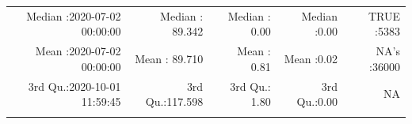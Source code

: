 \documentclass[
  10pt,
  a4paper,oneside]{article}
\begin{document}
\begin{longtable}[]{@{}rrrrr@{}}
\begin{minipage}[t]{0.27\columnwidth}\raggedleft
Median :2020-07-02 00:00:00\strut
\end{minipage} & \begin{minipage}[t]{0.16\columnwidth}\raggedleft
Median : 89.342\strut
\end{minipage} & \begin{minipage}[t]{0.14\columnwidth}\raggedleft
Median : 0.00\strut
\end{minipage} & \begin{minipage}[t]{0.14\columnwidth}\raggedleft
Median :0.00\strut
\end{minipage} & \begin{minipage}[t]{0.14\columnwidth}\raggedleft
TRUE :5383\strut
\end{minipage}\tabularnewline
\begin{minipage}[t]{0.27\columnwidth}\raggedleft
Mean :2020-07-02 00:00:00\strut
\end{minipage} & \begin{minipage}[t]{0.16\columnwidth}\raggedleft
Mean : 89.710\strut
\end{minipage} & \begin{minipage}[t]{0.14\columnwidth}\raggedleft
Mean : 0.81\strut
\end{minipage} & \begin{minipage}[t]{0.14\columnwidth}\raggedleft
Mean :0.02\strut
\end{minipage} & \begin{minipage}[t]{0.14\columnwidth}\raggedleft
NA's :36000\strut
\end{minipage}\tabularnewline
\begin{minipage}[t]{0.27\columnwidth}\raggedleft
3rd Qu.:2020-10-01 11:59:45\strut
\end{minipage} & \begin{minipage}[t]{0.16\columnwidth}\raggedleft
3rd Qu.:117.598\strut
\end{minipage} & \begin{minipage}[t]{0.14\columnwidth}\raggedleft
3rd Qu.: 1.80\strut
\end{minipage} & \begin{minipage}[t]{0.14\columnwidth}\raggedleft
3rd Qu.:0.00\strut
\end{minipage} & \begin{minipage}[t]{0.14\columnwidth}\raggedleft
NA\strut
\end{minipage}\tabularnewline
\begin{minipage}[t]{0.27\columnwidth}\raggedleft

\end{minipage}
\end{longtable}
\end{document}
